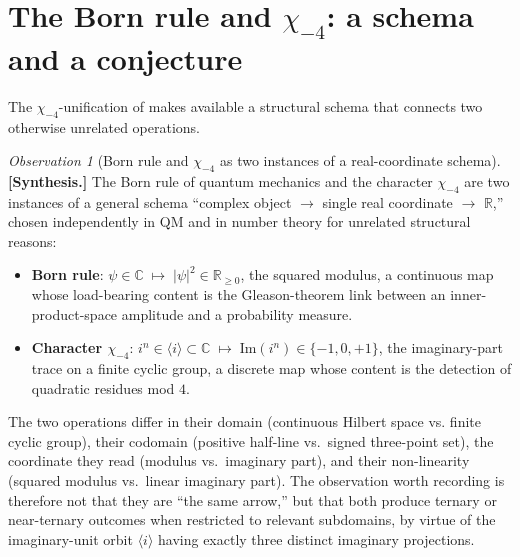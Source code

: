 \documentclass[11pt]{amsart}
\theoremstyle{plain}
\theoremstyle{definition}
\theoremstyle{remark}
\newtheorem*{observation}{Observation}
\newcommand{\R}{\mathbb{R}}
\newcommand{\C}{\mathbb{C}}
\begin{document}
\section{The Born rule and $\chi_{-4}$: a schema and a conjecture}\label{sec:born-rule-arrow}

The $\chi_{-4}$-unification of \cite{paper-gstar-A} makes available a
structural schema that connects two otherwise unrelated operations.

\begin{observation}[Born rule and $\chi_{-4}$ as two instances of a real-coordinate schema]\label{obs:born-arrow}
\textbf{[Synthesis.]} The Born rule of quantum mechanics and the
character $\chi_{-4}$ are two instances of a general schema
``complex object $\to$ single real coordinate $\to$ $\R$,'' chosen
independently in QM and in number theory for unrelated structural reasons:
\begin{itemize}[leftmargin=*, itemsep=4pt]
\item \textbf{Born rule}: $\psi \in \C \;\mapsto\; |\psi|^{2} \in \R_{\geq 0}$,
the squared modulus, a continuous map whose load-bearing content is the
Gleason-theorem link between an inner-product-space amplitude and a
probability measure.
\item \textbf{Character $\chi_{-4}$}: $i^{n} \in \langle i\rangle \subset \C \;\mapsto\; \mathrm{Im}(i^{n}) \in \{-1, 0, +1\}$,
the imaginary-part trace on a finite cyclic group, a discrete map whose
content is the detection of quadratic residues mod $4$.
\end{itemize}
The two operations differ in their domain (continuous Hilbert space vs.
finite cyclic group), their codomain (positive half-line vs.\ signed
three-point set), the coordinate they read (modulus vs.\ imaginary part),
and their non-linearity (squared modulus vs.\ linear imaginary part).
The observation worth recording is therefore not that they are ``the
same arrow,'' but that both produce ternary or near-ternary outcomes
when restricted to relevant subdomains, by virtue of the imaginary-unit
orbit $\langle i\rangle$ having exactly three distinct imaginary
projections.
\end{observation}
\end{document}
